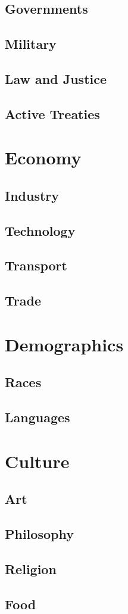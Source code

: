 \documentclass[11pt]{article}
\begin{document}
\subsection{Governments}
\label{sec:orgf585d61}
\subsection{Military}
\label{sec:org2d56a5c}
\subsection{Law and Justice}
\label{sec:org1aff790}
\subsection{Active Treaties}
\label{sec:orgdbf48a2}
\section{Economy}
\label{sec:org512ea7b}
\subsection{Industry}
\label{sec:orgceb1c9d}
\subsection{Technology}
\label{sec:org70358be}
\subsection{Transport}
\label{sec:org34af00f}
\subsection{Trade}
\label{sec:org8962678}
\section{Demographics}
\label{sec:org07c9506}
\subsection{Races}
\label{sec:org90e5d67}
\subsection{Languages}
\label{sec:orga649288}
\section{Culture}
\label{sec:org3e12321}
\subsection{Art}
\label{sec:orgfad0d51}
\subsection{Philosophy}
\label{sec:org9c49a8f}
\subsection{Religion}
\label{sec:org7243035}
\subsection{Food}
\label{sec:org20fd693}
\end{document}

